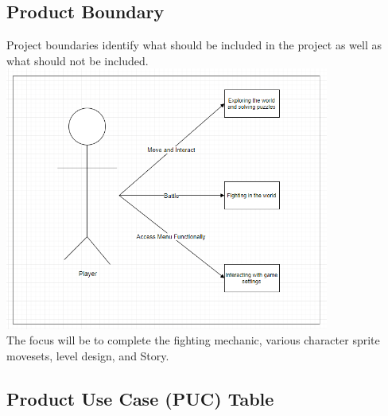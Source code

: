 \documentclass{article}
\begin{document}
	\subsection{Product Boundary}
	Project boundaries identify what should be included in the project as well as what should not be included.\\

	\includegraphics[width=0.8\textwidth]{product-boundary.png} \\

	The focus will be to complete the fighting mechanic, various character sprite movesets, level design, and Story.
	\subsection{Product Use Case (PUC) Table}
\end{document}
